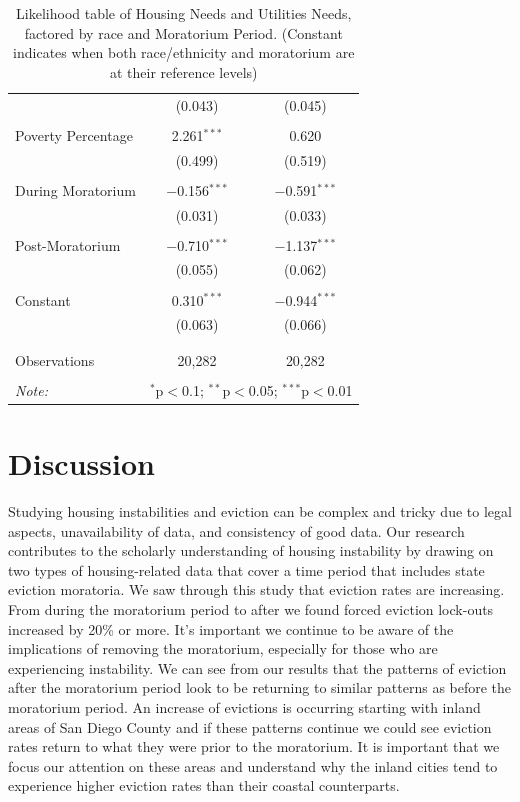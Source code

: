 \documentclass[man, 12pt, donotrepeattitle, floatsintext]{apa7} %
\begin{document}
\begin{table}[H]
{\begin{tabular}{@{\extracolsep{5pt}}lcc}
      & (0.043) & (0.045) \\
      & & \\
      Poverty Percentage & 2.261$^{***}$ & 0.620 \\
      & (0.499) & (0.519) \\
      & & \\
      During Moratorium & $-$0.156$^{***}$ & $-$0.591$^{***}$ \\
      & (0.031) & (0.033) \\
      & & \\
      Post-Moratorium & $-$0.710$^{***}$ & $-$1.137$^{***}$ \\
      & (0.055) & (0.062) \\
      & & \\
      Constant & 0.310$^{***}$ & $-$0.944$^{***}$ \\
      & (0.063) & (0.066) \\
      & & \\
      \hline \\[-1.8ex]
      Observations & 20,282 & 20,282 \\
      \hline
      \hline \\[-1.8ex]
      \textit{Note:} & \multicolumn{2}{r}{$^{*}$p$<$0.1; $^{**}$p$<$0.05; $^{***}$p$<$0.01} \\
    \end{tabular}%
  }
  \caption{Likelihood table of Housing Needs and Utilities Needs, factored by race and Moratorium Period. (Constant indicates when both race/ethnicity and moratorium are at their reference levels)}
  \label{}
\end{table}






\section{Discussion}

Studying housing instabilities and eviction can be complex and tricky due to legal aspects, unavailability of data, and consistency of good data\parencite{Cheng2021}. Our research contributes to the scholarly understanding of housing instability by drawing on two types of housing-related data that cover a time period that includes state eviction moratoria. We saw through this study that eviction rates are increasing. From during the moratorium period to after we found forced eviction lock-outs increased by 20\% or more. It's important we continue to be aware of the implications of removing the moratorium, especially for those who are experiencing instability. We can see from our results that the patterns of eviction after the moratorium period look to be returning to similar patterns as before the moratorium period. An increase of evictions is occurring starting with inland areas of San Diego County and if these patterns continue we could see eviction rates return to what they were prior to the moratorium. It is important that we focus our attention on these areas and understand why the inland cities tend to experience higher eviction rates than their coastal counterparts. 
\end{document}
